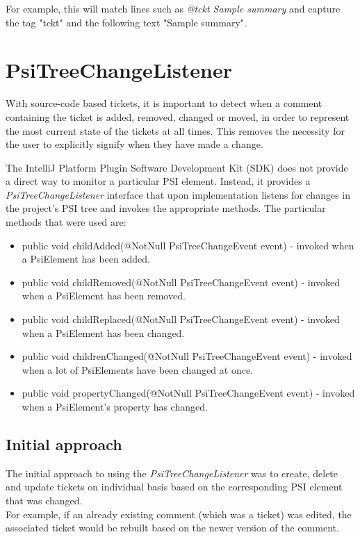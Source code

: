 \documentclass{4thYearProject}
\begin{document}
For example, this will match lines such as \textit{@tckt Sample summary} and capture the tag "tckt" and the following text "Sample summary". 

\section{PsiTreeChangeListener}

With source-code based tickets, it is important to detect when a comment containing the ticket is added, removed, changed or moved, in order to represent the most current state of the tickets at all times. This removes the necessity for the user to explicitly signify when they have made a change.

The IntelliJ Platform Plugin Software Development Kit (SDK) does not provide a direct way to monitor a particular PSI element. Instead, it provides a \textit{PsiTreeChangeListener} interface that upon implementation listens for changes in the project's PSI tree and invokes the appropriate methods. The particular methods that were used are:

\begin{itemize}
\item public void childAdded(@NotNull PsiTreeChangeEvent event) - invoked when a PsiElement has been added.
\item public void childRemoved(@NotNull PsiTreeChangeEvent event) - invoked when a PsiElement has been removed.
\item public void childReplaced(@NotNull PsiTreeChangeEvent event) - invoked when a PsiElement has been changed.
\item public void childrenChanged(@NotNull PsiTreeChangeEvent event) - invoked when a lot of PsiElements have been changed at once.
\item public void propertyChanged(@NotNull PsiTreeChangeEvent event) - invoked when a PsiElement's property has changed.

\end{itemize}

\subsection{Initial approach}

The initial approach to using the \textit{PsiTreeChangeListener} was to create, delete and update tickets on individual basis based on the corresponding PSI element that was changed. \\
For example, if an already existing comment (which was a ticket) was edited, the associated ticket would be rebuilt based on the newer version of the comment. 
\end{document}

